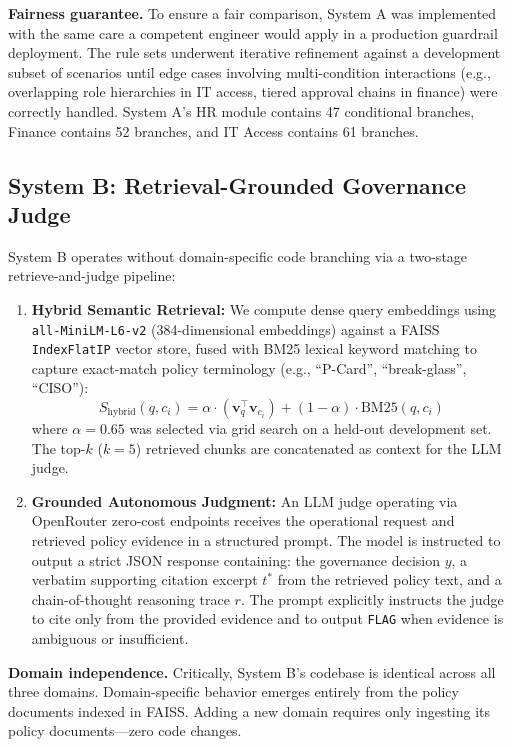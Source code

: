 \documentclass[sigconf,screen]{acmart}
\begin{document}
\noindent\textbf{Fairness guarantee.} To ensure a fair comparison, System A was implemented with the same care a competent engineer would apply in a production guardrail deployment. The rule sets underwent iterative refinement against a development subset of scenarios until edge cases involving multi-condition interactions (e.g., overlapping role hierarchies in IT access, tiered approval chains in finance) were correctly handled. System A's HR module contains 47 conditional branches, Finance contains 52 branches, and IT Access contains 61 branches.

\subsection{System B: Retrieval-Grounded Governance Judge}
System B operates without domain-specific code branching via a two-stage retrieve-and-judge pipeline:
\begin{enumerate}[leftmargin=*]
    \item \textbf{Hybrid Semantic Retrieval:} We compute dense query embeddings using \texttt{all-MiniLM-L6-v2} \cite{reimers2019sentence} (384-dimensional embeddings) against a FAISS \cite{johnson2019billion} \texttt{IndexFlatIP} vector store, fused with BM25 lexical keyword matching to capture exact-match policy terminology (e.g., ``P-Card'', ``break-glass'', ``CISO''):
    \begin{equation}
    S_{\text{hybrid}}(q, c_i) = \alpha \cdot (\mathbf{v}_q^\top \mathbf{v}_{c_i}) + (1-\alpha) \cdot \text{BM25}(q, c_i)
    \end{equation}
    where $\alpha = 0.65$ was selected via grid search on a held-out development set. The top-$k$ ($k=5$) retrieved chunks are concatenated as context for the LLM judge.
    
    \item \textbf{Grounded Autonomous Judgment:} An LLM judge operating via OpenRouter zero-cost endpoints receives the operational request and retrieved policy evidence in a structured prompt. The model is instructed to output a strict JSON response containing: the governance decision $y$, a verbatim supporting citation excerpt $t^*$ from the retrieved policy text, and a chain-of-thought reasoning trace $r$. The prompt explicitly instructs the judge to cite only from the provided evidence and to output \texttt{FLAG} when evidence is ambiguous or insufficient.
\end{enumerate}

\noindent\textbf{Domain independence.} Critically, System B's codebase is identical across all three domains. Domain-specific behavior emerges entirely from the policy documents indexed in FAISS. Adding a new domain requires only ingesting its policy documents---zero code changes.
\end{document}
